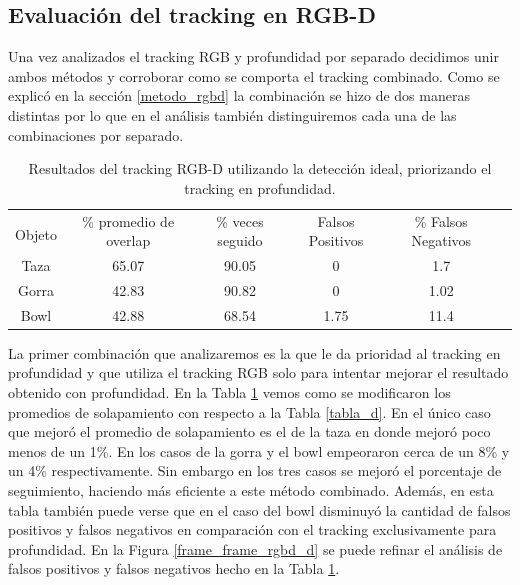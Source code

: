 \subsection{Evaluación del tracking en RGB-D}
Una vez analizados el tracking RGB y profundidad por separado decidimos unir ambos métodos y corroborar como se comporta el tracking combinado. Como se explicó en la sección \ref{metodo_rgbd} la combinación se hizo de dos maneras distintas por lo que en el análisis también distinguiremos cada una de las combinaciones por separado.

\begin{table}[h]
	\centering
    \begin{tabular}{|c|c|c|c|c|c|}
    \hline
    & \multirow{2}{2.4cm}{\% promedio de overlap} & \multirow{2}{2cm}{\% veces seguido} & \multirow{2}{1.6cm}{Falsos Positivos} & \multirow{2}{1.6cm}{\% Falsos Negativos}\\
	Objeto & & & &\\
    \hline
    Taza   & 65.07      & 90.05     & 0        &   1.7 \\
    \hline
    Gorra  & 42.83      & 90.82     & 0        &  1.02 \\
    \hline
    Bowl   & 42.88      & 68.54     & 1.75     &  11.4 \\
    \hline
    \end{tabular}
\caption{Resultados del tracking RGB-D utilizando la detección ideal, priorizando el tracking en profundidad.}
\label{tabla_rgbd_d}
\end{table}

La primer combinación que analizaremos es la que le da prioridad al tracking en profundidad y que utiliza el tracking RGB solo para intentar mejorar el resultado obtenido con profundidad. En la Tabla \ref{tabla_rgbd_d} vemos como se modificaron los promedios de solapamiento con respecto a la Tabla \ref{tabla_d}. En el único caso que mejoró el promedio de solapamiento es el de la taza en donde mejoró poco menos de un 1\%. En los casos de la gorra y el bowl empeoraron cerca de un 8\% y un 4\% respectivamente. Sin embargo en los tres casos se mejoró el porcentaje de seguimiento, haciendo más eficiente a este método combinado. Además, en esta tabla también puede verse que en el caso del bowl disminuyó la cantidad de falsos positivos y falsos negativos en comparación con el tracking exclusivamente para profundidad. En la Figura \ref{frame_frame_rgbd_d} se puede refinar el análisis de falsos positivos y falsos negativos hecho en la Tabla \ref{tabla_rgbd_d}.

